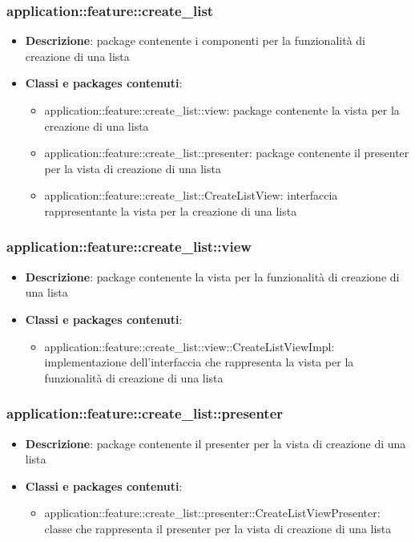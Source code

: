 \subsubsection{application::feature::create\_list}
\begin{itemize}
	\item \textbf{Descrizione}: package contenente i componenti per la funzionalità di creazione di una lista
	\item \textbf{Classi e packages contenuti}:
	\begin{itemize}
	\item application::feature::create\_list::view: package contenente la vista per la creazione di una lista
	\item application::feature::create\_list::presenter: package contenente il presenter per la vista di creazione di una lista
	\item application::feature::create\_list::CreateListView: interfaccia rappresentante la vista per la creazione di una lista
	\end{itemize}
\end{itemize}

\subsubsection{application::feature::create\_list::view}
\begin{itemize}
	\item \textbf{Descrizione}: package contenente la vista per la funzionalità di creazione di una lista
	\item \textbf{Classi e packages contenuti}:
	\begin{itemize}
	\item application::feature::create\_list::view::CreateListViewImpl: implementazione dell'interfaccia che rappresenta la vista per la funzionalità di creazione di una lista
	\end{itemize}
\end{itemize}

\subsubsection{application::feature::create\_list::presenter}
\begin{itemize}
	\item \textbf{Descrizione}: package contenente il presenter per la vista di creazione di una lista
	\item \textbf{Classi e packages contenuti}:
	\begin{itemize}
	\item application::feature::create\_list::presenter::CreateListViewPresenter: classe che rappresenta il presenter per la vista di creazione di una lista
	\end{itemize}
\end{itemize}

